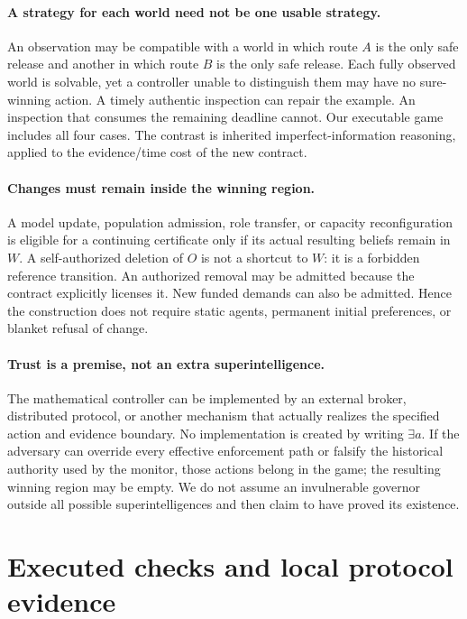 \paragraph{A strategy for each world need not be one usable strategy.}
An observation may be compatible with a world in which route $A$ is the only safe release and another in which route $B$ is the only safe release. Each fully observed world is solvable, yet a controller unable to distinguish them may have no sure-winning action. A timely authentic inspection can repair the example. An inspection that consumes the remaining deadline cannot. Our executable game includes all four cases. The contrast is inherited imperfect-information reasoning, applied to the evidence/time cost of the new contract.

\paragraph{Changes must remain inside the winning region.}
A model update, population admission, role transfer, or capacity reconfiguration is eligible for a continuing certificate only if its actual resulting beliefs remain in $W$. A self-authorized deletion of $O$ is not a shortcut to $W$: it is a forbidden reference transition. An authorized removal may be admitted because the contract explicitly licenses it. New funded demands can also be admitted. Hence the construction does not require static agents, permanent initial preferences, or blanket refusal of change.

\paragraph{Trust is a premise, not an extra superintelligence.}
The mathematical controller can be implemented by an external broker, distributed protocol, or another mechanism that actually realizes the specified action and evidence boundary. No implementation is created by writing $\exists a$. If the adversary can override every effective enforcement path or falsify the historical authority used by the monitor, those actions belong in the game; the resulting winning region may be empty. We do not assume an invulnerable governor outside all possible superintelligences and then claim to have proved its existence.

\section{Executed checks and local protocol evidence}
\label{sec:evaluation}
